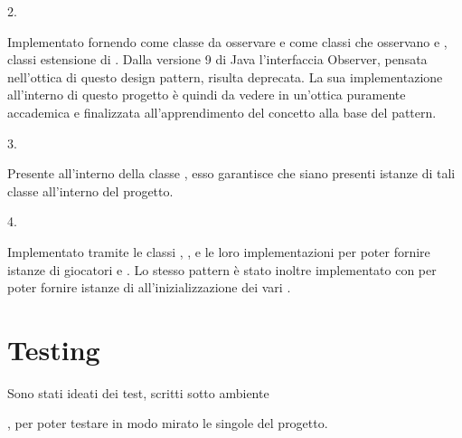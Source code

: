 \documentclass[letterpaper,10pt,italian,openany,oneside]{sphinxmanual}
\begin{document}
2.  %
\begin{footnote}[3]\sphinxAtStartFootnote
{}
%
\end{footnote}
Implementato fornendo come classe da osservare  e come classi che osservano  e , classi estensione di .
Dalla versione 9 di Java l’interfaccia Observer, pensata nell’ottica di questo design pattern, risulta deprecata.
La sua implementazione all’interno di questo progetto è quindi da vedere in un’ottica puramente accademica e finalizzata all’apprendimento del concetto alla base del pattern.

3.  %
\begin{footnote}[4]\sphinxAtStartFootnote
{}
%
\end{footnote}
Presente all’interno della classe , esso garantisce che siano presenti  istanze di tali classe all’interno del progetto.

4.  %
\begin{footnote}[5]\sphinxAtStartFootnote
{}
%
\end{footnote}
Implementato tramite le classi , ,  e le loro implementazioni per poter fornire istanze di giocatori  e .
Lo stesso pattern è stato inoltre implementato con  per poter fornire istanze di  all’inizializzazione dei vari .


\section{Testing}
\label{\detokenize{introduzione:testing}}
Sono stati ideati dei test, scritti sotto ambiente  %
\begin{footnote}[6]\sphinxAtStartFootnote
{}
%
\end{footnote}, per poter testare in modo mirato le singole  del progetto.
\end{document}
